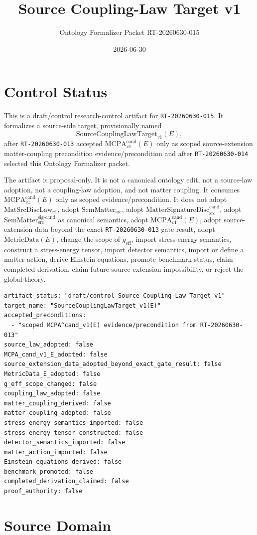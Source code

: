 \documentclass[11pt]{article}
\title{Source Coupling-Law Target v1}
\author{Ontology Formalizer Packet RT-20260630-015}
\date{2026-06-30}
\newcommand{\MetricData}{\mathrm{MetricData}}
\newcommand{\geff}{g_{\mathrm{eff}}}
\newcommand{\MatSrcDiscLaw}{\mathrm{MatSrcDiscLaw}_{v1}}
\newcommand{\SemMatterSrc}{\mathrm{SemMatter}_{\mathrm{src}}}
\newcommand{\SemMatterSig}{\mathrm{SemMatter}_{\mathrm{src}}^{\mathrm{sig\text{-}cand}}}
\newcommand{\MatSigDisc}{\mathrm{MatterSignatureDisc}_{\mathrm{src}}^{\mathrm{cand}}}
\newcommand{\MCPA}{\mathrm{MCPA}^{\mathrm{cand}}_{v1}}
\newcommand{\SourceCoupTarget}{\mathrm{SourceCouplingLawTarget}_{v1}}
\begin{document}
\maketitle

\section{Control Status}

This is a draft/control research-control artifact for
\texttt{RT-20260630-015}. It formalizes a source-side target,
provisionally named
\[
  \SourceCoupTarget(E),
\]
after \texttt{RT-20260630-013} accepted \(\MCPA(E)\) only as scoped
source-extension matter-coupling precondition evidence/precondition and after
\texttt{RT-20260630-014} selected this Ontology Formalizer packet.

The artifact is proposal-only. It is not a canonical ontology edit, not a
source-law adoption, not a coupling-law adoption, and not matter coupling.
It consumes \(\MCPA(E)\) only as scoped evidence/precondition. It does not
adopt \(\MatSrcDiscLaw\), adopt \(\SemMatterSrc\), adopt \(\MatSigDisc\),
adopt \(\SemMatterSig\) as canonical semantics, adopt \(\MCPA(E)\), adopt
source-extension data beyond the exact \texttt{RT-20260630-013} gate result,
adopt \(\MetricData(E)\), change the scope of \(\geff\), import
stress-energy semantics, construct a stress-energy tensor, import detector
semantics, import or define a matter action, derive Einstein equations,
promote benchmark status, claim completed derivation, claim future
source-extension impossibility, or reject the global theory.

\begin{verbatim}
artifact_status: "draft/control Source Coupling-Law Target v1"
target_name: "SourceCouplingLawTarget_v1(E)"
accepted_preconditions:
  - "scoped MCPA^cand_v1(E) evidence/precondition from RT-20260630-013"
source_law_adopted: false
MCPA_cand_v1_E_adopted: false
source_extension_data_adopted_beyond_exact_gate_result: false
MetricData_E_adopted: false
g_eff_scope_changed: false
coupling_law_adopted: false
matter_coupling_derived: false
matter_coupling_adopted: false
stress_energy_semantics_imported: false
stress_energy_tensor_constructed: false
detector_semantics_imported: false
matter_action_imported: false
Einstein_equations_derived: false
benchmark_promoted: false
completed_derivation_claimed: false
proof_authority: false
\end{verbatim}

\section{Source Domain}
\end{document}
